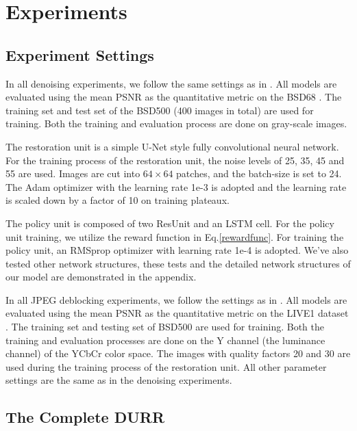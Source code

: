 \documentclass{article} %
\begin{document}
\section{Experiments}

\subsection{Experiment Settings}

In all denoising experiments, we follow the same settings as in
\cite{Chen2017Trainable,zhang2017beyond,lefkimmiatis2017universal}.
All models are evaluated using the mean PSNR as the quantitative metric
on the BSD68 \citep{MartinFTM01}. The training set and test set of
the BSD500 (400 images in total) are used for training.
Both the training and evaluation process are done on gray-scale images.

The restoration unit is a simple U-Net \citep{ronneberger2015u} style
fully convolutional neural network. For the training process of the restoration unit,
the noise levels of 25, 35, 45 and 55 are used. Images are
cut into $64 \times 64$ patches, and the batch-size is set to 24.
The Adam optimizer with the learning rate 1e-3 is adopted and
the learning rate is scaled down by a factor of 10 on training plateaux.

The policy unit is composed of two ResUnit and an LSTM cell.
For the policy unit training, we utilize the reward function
in Eq.\ref{rewardfunc}. For training the policy unit,
an RMSprop optimizer with learning rate 1e-4 is adopted.
We've also tested other network structures, these tests and
the detailed network structures of our model are demonstrated
in the appendix.

In all JPEG deblocking experiments, we follow the settings as in
\cite{zhang2017beyond,zhang2018dmcnn}. All models are evaluated using
the mean PSNR as the quantitative metric on
the LIVE1 dataset \citep{sheikh2005live}. The training set and testing set
of BSD500 are used for training. Both the training and evaluation processes
are done on the Y channel (the luminance channel) of the YCbCr color space.
The images with quality factors 20 and 30 are used during
the training process of the restoration unit. All other parameter settings
are the same as in the denoising experiments.


\subsection{The Complete DURR}
\end{document}
